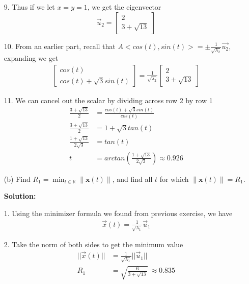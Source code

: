 \documentclass[12pt]{article}
\begin{document}
\begin{enumerate}
          9. Thus if we let $x = y = 1$, we get the eigenvector
          \[
              \vec{u}_2 = \begin{bmatrix}
                  2 \\ 3 + \sqrt{13}
              \end{bmatrix}
          \]

          10. From an earlier part, recall that $A <cos(t), sin(t)> = \pm{\frac{1}{\sqrt{\lambda{}_2}}}\vec{u_2}$, expanding we get
          \begin{align*}
              \begin{bmatrix} cos(t) \\ cos(t) + \sqrt{3}sin(t) \end{bmatrix} = \frac{1}{\sqrt{\lambda_{2}}}\begin{bmatrix} 2 \\ 3 + \sqrt{13} \end{bmatrix}
          \end{align*}

          11. We can cancel out the scalar by dividing across row 2 by row 1
          \begin{align*}
              \frac{3+\sqrt{13}}{2}         & = \frac{cos(t) + \sqrt{3}sin(t)}{cos(t)}               \\
              \frac{3+\sqrt{13}}{2}         & = 1 + \sqrt{3}tan(t)                                   \\
              \frac{1+\sqrt{13}}{2\sqrt{3}} & = tan(t)                                               \\
              t                             & = arctan(\frac{1+\sqrt{13}}{2\sqrt{3}}) \approx{0.926}
          \end{align*}

    \item[(b)] Find $R_{1}=\min_{t\in\mathbb{R}}\|\mathbf{x}(t)\|$, and find all $t$ for which $\|\mathbf{x}(t)\|=R_{1}$.

          \textbf{Solution:}

          1. Using the minimizer formula we found from previous exercise, we have
          \begin{align*}
              \vec{x}(t) = \frac{1}{\sqrt{\lambda{}_1}}\vec{u}_1
          \end{align*}

          2. Take the norm of both sides to get the minimum value
          \begin{align*}
              ||\vec{x}(t)|| & = \frac{1}{\sqrt{\lambda{}_1}}||\vec{u}_1||     \\
              R_1            & = \sqrt{\frac{6}{3+\sqrt{13}}} ~ \approx{0.835}
          \end{align*}


\end{enumerate}
\end{document}
